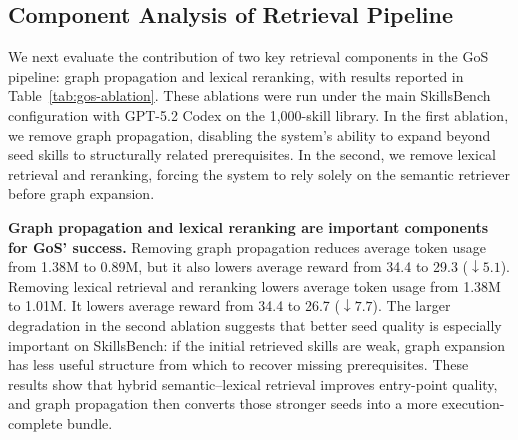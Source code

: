 % 
\subsection{Component Analysis of Retrieval Pipeline}

We next evaluate the contribution of two key retrieval components in the GoS pipeline: graph propagation and lexical reranking, with results reported in Table~\ref{tab:gos-ablation}.
%
These ablations were run under the main SkillsBench configuration with GPT-5.2 Codex on the 1{,}000-skill library.
%
In the first ablation, we remove graph propagation, disabling the system's ability to expand beyond seed skills to structurally related prerequisites. 
%
In the second, we remove lexical retrieval and reranking, forcing the system to rely solely on the semantic retriever before graph expansion.
%


\textbf{Graph propagation and lexical reranking are important components for GoS' success.}
%
Removing graph propagation reduces average token usage from 1.38M to 0.89M, but it also lowers average reward from 34.4 to 29.3 ($\downarrow5.1$). 
%
Removing lexical retrieval and reranking lowers average token usage from 1.38M to 1.01M. It lowers average reward from 34.4 to 26.7 ($\downarrow7.7$). 
%
The larger degradation in the second ablation suggests that better seed quality is especially important on SkillsBench: if the initial retrieved skills are weak, graph expansion has less useful structure from which to recover missing prerequisites.
These results show that hybrid semantic--lexical retrieval improves entry-point quality, and graph propagation then converts those stronger seeds into a more execution-complete bundle. 
%

%
